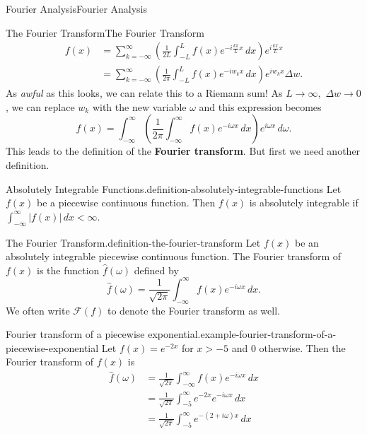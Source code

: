 \documentclass[10pt,]{book}
\newcommand{\terminology}[1]{\textbf{#1}}
\numberwithin{equation}{section}
\begin{document}
\begin{chapterptx}{Fourier Analysis}{}{Fourier Analysis}{}{}
\begin{sectionptx}{The Fourier Transform}{}{The Fourier Transform}{}{}
\begin{align*}
f(x) & = \sum_{k=-\infty}^{\infty}\left(\frac{1}{2L}\int_{-L}^{L}f(x)e^{-i\frac{k\pi}{L}x}\,dx\right)e^{i\frac{k\pi}{L}x} \\
& = \sum_{k=-\infty}^{\infty}\left(\frac{1}{2\pi}\int_{-L}^{L}f(x)e^{-iw_{k}x}\,dx\right)e^{iw_{k}x}\Delta w. 
\end{align*}
As \emph{awful} as this looks, we can relate this to a Riemann sum! As \(L\to\infty,\) \(\Delta w\to0\), we can replace \(w_{k}\) with the new variable \(\omega\) and this expression becomes%
\begin{equation*}
f(x) = \int_{-\infty}^{\infty}\left(\frac{1}{2\pi}\int_{-\infty}^{\infty}f(x)e^{-i\omega x}\,dx\right)e^{i\omega x}\,d\omega.
\end{equation*}
This leads to the definition of the \terminology{Fourier transform}. But first we need another definition.%
\begin{definition}{Absolutely Integrable Functions.}{definition-absolutely-integrable-functions}%
\hypertarget{p-422}{}%
Let \(f(x)\) be a piecewise continuous function. Then \(f(x)\) is absolutely integrable if \(\int_{-\infty}^{\infty}|f(x)|\,dx<\infty.\)%
\end{definition}
\begin{definition}{The Fourier Transform.}{definition-the-fourier-transform}%
\hypertarget{p-423}{}%
Let \(f(x)\) be an absolutely integrable piecewise continuous function. The Fourier transform of \(f(x)\) is the function \(\hat{f}(\omega)\) defined by%
\begin{equation*}
\hat{f}(\omega) = \frac{1}{\sqrt{2\pi}}\int_{-\infty}^{\infty}f(x)e^{-i\omega x}\,dx.
\end{equation*}
We often write \(\mathcal{F}(f)\) to denote the Fourier transform as well.%
\end{definition}
\begin{example}{Fourier transform of a piecewise exponential.}{example-fourier-transform-of-a-piecewise-exponential}%
\hypertarget{p-424}{}%
Let \(f(x) = e^{-2x}\) for \(x>-5\) and \(0\) otherwise. Then the Fourier transform of \(f(x)\) is%
\begin{align*}
\hat{f}(\omega) & = \frac{1}{\sqrt{2\pi}}\int_{-\infty}^{\infty}f(x)e^{-i\omega x}\,dx \\
& = \frac{1}{\sqrt{2\pi}}\int_{-5}^{\infty}e^{-2x}e^{-i\omega x}\,dx \\
& = \frac{1}{\sqrt{2\pi}}\int_{-5}^{\infty}e^{-(2+i\omega)x}\,dx \\

\end{align*}
\end{example}
\end{sectionptx}
\end{chapterptx}
\end{document}
